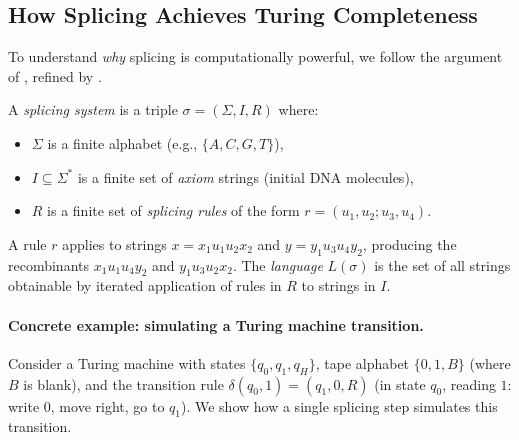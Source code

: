 \subsection{How Splicing Achieves Turing Completeness}

To understand \emph{why} splicing is computationally powerful, we follow the argument of \citet{head1987}, refined by \citet{daleykari2002}.

\begin{dogmadef}
A \emph{splicing system} is a triple $\sigma = (\Sigma, I, R)$ where:
\begin{itemize}[leftmargin=1.5em]
  \item $\Sigma$ is a finite alphabet (e.g., $\{A, C, G, T\}$),
  \item $I \subseteq \Sigma^*$ is a finite set of \emph{axiom} strings (initial DNA molecules),
  \item $R$ is a finite set of \emph{splicing rules} of the form $r = (u_1, u_2; u_3, u_4)$.
\end{itemize}
A rule $r$ applies to strings $x = x_1 u_1 u_2 x_2$ and $y = y_1 u_3 u_4 y_2$, producing the recombinants $x_1 u_1 u_4 y_2$ and $y_1 u_3 u_2 x_2$. The \emph{language} $L(\sigma)$ is the set of all strings obtainable by iterated application of rules in $R$ to strings in $I$.
\end{dogmadef}

\paragraph{Concrete example: simulating a Turing machine transition.}
Consider a Turing machine with states $\{q_0, q_1, q_H\}$, tape alphabet $\{0, 1, B\}$ (where $B$ is blank), and the transition rule $\delta(q_0, 1) = (q_1, 0, R)$ (in state $q_0$, reading $1$: write $0$, move right, go to $q_1$). We show how a single splicing step simulates this transition.

